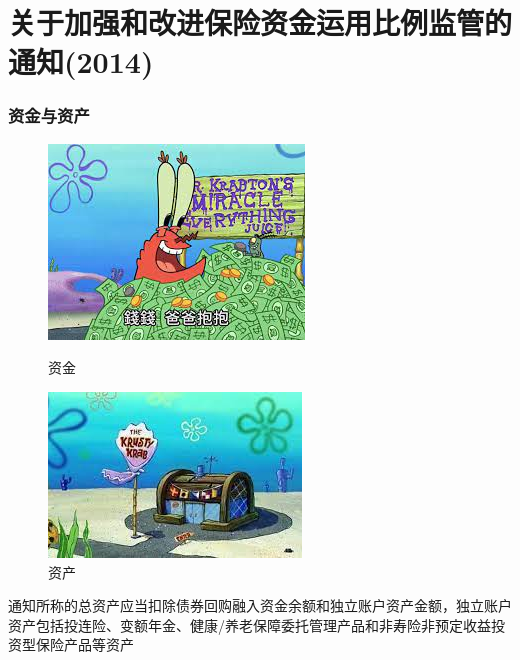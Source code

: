\documentclass[a4paper,12pt]{ctexbeamer}
\begin{document}
\section{关于加强和改进保险资金运用比例监管的通知(2014)}
\begin{frame}
    \frametitle{资金与资产}
    \begin{figure}
        \begin{minipage}{.48\textwidth}
            \centering
            \includegraphics[width=\linewidth]{img/money.jpeg}
            \caption{资金}
        \end{minipage}
        \begin{minipage}{.48\textwidth}
            \centering
            \includegraphics[width=\linewidth]{img/asset.jpeg}
            \caption{资产}
        \end{minipage}
    \end{figure}
    通知所称的总资产应当扣除债券回购融入资金余额和独立账户资产金额，独立账户资产包括投连险、变额年金、健康/养老保障委托管理产品和非寿险非预定收益投资型保险产品等资产
\end{frame}
\end{document}
